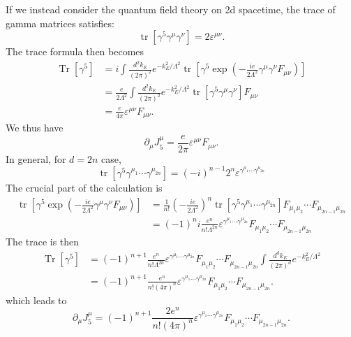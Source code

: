 \documentclass[aps,prb,superscriptaddress,nofootinbib]{revtex4}
\def \tr{\operatorname{tr}}
\def \Tr{\operatorname{Tr}}
\begin{document}
If we instead consider the quantum field theory on 2d spacetime, the trace of gamma matrices satisfies:
\begin{equation}
	\tr[\gamma^5 \gamma^\mu \gamma^\nu] = 2 \varepsilon^{\mu\nu}.
\end{equation}
The trace formula then becomes
\begin{equation}
\begin{aligned}
	\Tr[\gamma^5] 
	&= i\int \frac{d^2 k_E}{(2\pi)^2} e^{-k_E^2/\Lambda^2}\tr\left[\gamma^5 \exp\left(-\frac{ie}{2\Lambda^2} \gamma^\mu \gamma^\nu F_{\mu\nu}\right)\right] \\
	&= \frac{e}{2\Lambda^2} \int \frac{d^2 k_E}{(2\pi)^2} e^{-k_E^2/\Lambda^2}\tr\left[\gamma^5 \gamma^\mu \gamma^\nu \right]F_{\mu\nu} \\
	&= \frac{e}{4\pi}\varepsilon^{\mu\nu}F_{\mu\nu}.
\end{aligned}
\end{equation}
We thus have
\begin{equation}
	\partial_\mu J^\mu_5 = \frac{e}{2\pi} \varepsilon^{\mu\nu} F_{\mu\nu}.
\end{equation}
In general, for $d=2n$ case, 
\begin{equation}
	\tr[\gamma^5 \gamma^{\mu_1}\cdots \gamma^{\mu_{2n}}] = (-i)^{n-1} 2^n \varepsilon^{\gamma^{\mu_1}\cdots \gamma^{\mu_{2n}}}
\end{equation}
The crucial part of the calculation is
\begin{equation}
\begin{aligned}
	\tr\left[\gamma^5 \exp\left(-\frac{ie}{2\Lambda^2} \gamma^\mu \gamma^\nu F_{\mu\nu}\right)\right] 
	&=\frac{1}{n!}\left(-\frac{ie}{2\Lambda^2}\right)^n \tr[\gamma^5 \gamma^{\mu_1}\cdots \gamma^{\mu_{2n}}] F_{\mu_1\mu_2}\cdots F_{\mu_{2n-1}\mu_{2n}} \\
	&=(-1)^n i \frac{e^n}{n! \Lambda^{2n}} \varepsilon^{\gamma^{\mu_1}\cdots \gamma^{\mu_{2n}}} F_{\mu_1\mu_2}\cdots F_{\mu_{2n-1}\mu_{2n}}
\end{aligned}
\end{equation}
The trace is then
\begin{equation}
\begin{aligned}
	\Tr[\gamma^5] 
	&= (-1)^{n+1} \frac{e^n}{n! \Lambda^{2n}}\varepsilon^{\gamma^{\mu_1}\cdots \gamma^{\mu_{2n}}} F_{\mu_1\mu_2}\cdots F_{\mu_{2n-1}\mu_{2n}} \int \frac{d^d k_E}{(2\pi)^d} e^{-k_E^2/\Lambda^2} \\
	&= (-1)^{n+1} \frac{e^n}{n! (4\pi)^n} \varepsilon^{\gamma^{\mu_1}\cdots \gamma^{\mu_{2n}}} F_{\mu_1\mu_2}\cdots F_{\mu_{2n-1}\mu_{2n}}.
\end{aligned}
\end{equation}
which leads to
\begin{equation}
	\partial_\mu J^\mu_5 = (-1)^{n+1} \frac{2 e^n}{n! (4\pi)^n} \varepsilon^{\gamma^{\mu_1}\cdots \gamma^{\mu_{2n}}} F_{\mu_1\mu_2}\cdots F_{\mu_{2n-1}\mu_{2n}}.
\end{equation}
\end{document}
